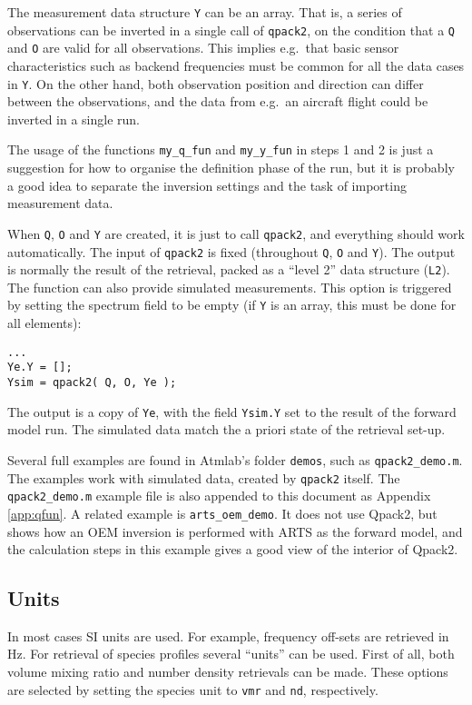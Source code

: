 \documentclass[a4paper,11pt]{article}
\begin{document}
The measurement data structure \verb|Y| can be an array. That is, a series of
observations can be inverted in a single call of \verb|qpack2|, on the
condition that a \verb|Q| and \verb|O| are valid for all observations. This
implies e.g.\ that basic sensor characteristics such as backend frequencies
must be common for all the data cases in \verb|Y|. On the other hand, both
observation position and direction can differ between the observations, and the
data from e.g.\ an aircraft flight could be inverted in a single run.

The usage of the functions \verb|my_q_fun| and \verb|my_y_fun| in steps
1 and 2 is just a suggestion for how to organise the definition phase of the
run, but it is probably a good idea to separate the inversion settings and the
task of importing measurement data.

When \verb|Q|, \verb|O| and \verb|Y| are created, it is just to call
\verb|qpack2|, and everything should work automatically. The input of
\verb|qpack2| is fixed (throughout \verb|Q|, \verb|O| and \verb|Y|). The output
is normally the result of the retrieval, packed as a ``level 2'' data
structure (\verb|L2|). The function can also provide simulated measurements.
This option is triggered by setting the spectrum field to be empty (if \verb|Y|
is an array, this must be done for all elements):
\begin{verbatim}
...
Ye.Y = []; 
Ysim = qpack2( Q, O, Ye );
\end{verbatim}
The output is a copy of \verb|Ye|, with the field \verb|Ysim.Y| set to the
result of the forward model run. The simulated data match the a priori state of
the retrieval set-up.

Several full examples are found in Atmlab's folder \verb|demos|, such as
\verb|qpack2_demo.m|. The examples work with simulated data, created by
\verb|qpack2| itself. The \verb|qpack2_demo.m| example file is also appended to
this document as Appendix \ref{app:qfun}. A related example is
\verb|arts_oem_demo|. It does not use Qpack2, but shows how an OEM inversion is
performed with ARTS as the forward model, and the calculation steps in this
example gives a good view of the interior of Qpack2.


\subsection{Units}
\label{sec:units}
%
In most cases SI units are used. For example, frequency off-sets are retrieved
in Hz. For retrieval of species profiles several ``units'' can be used. First
of all, both volume mixing ratio and number density retrievals can be made.
These options are selected by setting the species unit to \verb|vmr| and
\verb|nd|, respectively.
\end{document}
